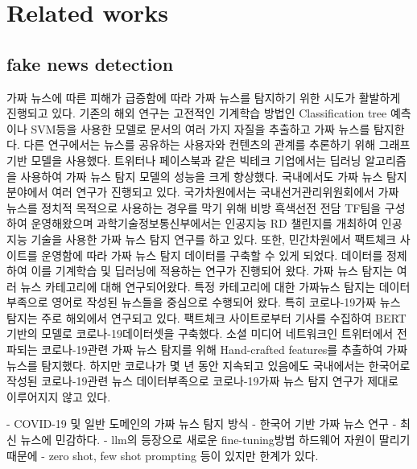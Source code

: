 \documentclass[a4paper,fleqn]{cas-sc}
\begin{document}

\section{Related works}
\subsection{fake news detection}
가짜 뉴스에 따른 피해가 급증함에 따라 가짜 뉴스를 탐지하기 위한 시도가 활발하게 진행되고 있다. 
기존의 해외 연구는 고전적인 기계학습 방법인 Classification tree 예측이나 SVM등을 사용한 모델로 문서의 여러 가지 자질을 추출하고 가짜 뉴스를 탐지한다. 
다른 연구에서는 뉴스를 공유하는 사용자와 컨텐츠의 관계를 추론하기 위해 그래프 기반 모델을 사용했다. 트위터나 페이스북과 같은 빅테크 기업에서는 딥러닝 알고리즘을 사용하여 가짜 뉴스 탐지 모델의 성능을 크게 향상했다. 
국내에서도 가짜 뉴스 탐지 분야에서 여러 연구가 진행되고 있다. 
국가차원에서는 국내선거관리위원회에서 가짜 뉴스를 정치적 목적으로 사용하는 경우를 막기 위해 비방 흑색선전 전담 TF팀을 구성하여 운영해왔으며 과학기술정보통신부에서는 인공지능 RD 챌린지를 개최하여 인공지능 기술을 사용한 가짜 뉴스 탐지 연구를 하고 있다. 
또한, 민간차원에서 팩트체크 사이트를 운영함에 따라 가짜 뉴스 탐지 데이터를 구축할 수 있게 되었다. 
데이터를 정제하여 이를 기계학습 및 딥러닝에 적용하는 연구가 진행되어 왔다.
가짜 뉴스 탐지는 여러 뉴스 카테고리에 대해 연구되어왔다. 
특정 카테고리에 대한 가짜뉴스 탐지는 데이터 부족으로 영어로 작성된 뉴스들을 중심으로 수행되어 왔다. 특히 코로나-19가짜 뉴스 탐지는 주로 해외에서 연구되고 있다. 팩트체크 사이트로부터 기사를 수집하여 BERT 기반의 모델로 코로나-19데이터셋을 구축했다. 소셜 미디어 네트워크인 트위터에서 전파되는 코로나-19관련 가짜 뉴스 탐지를 위해 Hand-crafted features를 추출하여 가짜 뉴스를 탐지했다. 하지만 코로나가 몇 년 동안 지속되고 있음에도 국내에서는 한국어로 작성된 코로나-19관련 뉴스 데이터부족으로 코로나-19가짜 뉴스 탐지 연구가 제대로 이루어지지 않고 있다.

- COVID-19 및 일반 도메인의 가짜 뉴스 탐지 방식
- 한국어 기반 가짜 뉴스 연구
- 최신 뉴스에 민감하다.
- llm의 등장으로 새로운 fine-tuning방법 하드웨어 자원이 딸리기 때문에
- zero shot, few shot prompting 등이 있지만 한계가 있다.
\end{document}

